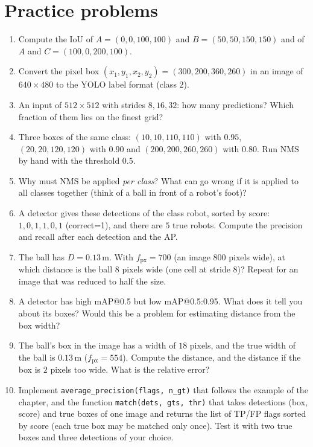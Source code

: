 \section*{Practice problems}
\begin{enumerate}[label=\textbf{\thechapter.\arabic*}]
  \item Compute the IoU of $A=(0,0,100,100)$ and $B=(50,50,150,150)$ and of $A$ and $C=(100,0,200,100)$.
  \item Convert the pixel box $(x_1,y_1,x_2,y_2)=(300,200,360,260)$ in an image of $640\times480$ to the YOLO label format (class $2$).
  \item An input of $512\times512$ with strides $8,16,32$: how many predictions? Which fraction of them lies on the finest grid?
  \item Three boxes of the same class: $(10,10,110,110)$ with $0.95$, $(20,20,120,120)$ with $0.90$ and $(200,200,260,260)$ with $0.80$. Run NMS by hand with the threshold $0.5$.
  \item Why must NMS be applied \emph{per class}? What can go wrong if it is applied to all classes together (think of a ball in front of a robot's foot)?
  \item A detector gives these detections of the class robot, sorted by score: $1,0,1,1,0,1$ (correct=1), and there are $5$ true robots. Compute the precision and recall after each detection and the AP.
  \item The ball has $D=0.13$\,m. With $f_\text{px}=700$ (an image $800$ pixels wide), at which distance is the ball $8$ pixels wide (one cell at stride $8$)? Repeat for an image that was reduced to half the size.
  \item A detector has high mAP@0.5 but low mAP@0.5:0.95. What does it tell you about its boxes? Would this be a problem for estimating distance from the box width?
  \item The ball's box in the image has a width of $18$ pixels, and the true width of the ball is $0.13$\,m ($f_\text{px}=554$). Compute the distance, and the distance if the box is $2$ pixels too wide. What is the relative error?
  \item[\textbf{\thechapter.10}$\star$] Implement \texttt{average\_precision(flags, n\_gt)} that follows the example of the chapter, and the function \texttt{match(dets, gts, thr)} that takes detections (box, score) and true boxes of one image and returns the list of TP/FP flags sorted by score (each true box may be matched only once). Test it with two true boxes and three detections of your choice.
\end{enumerate}
